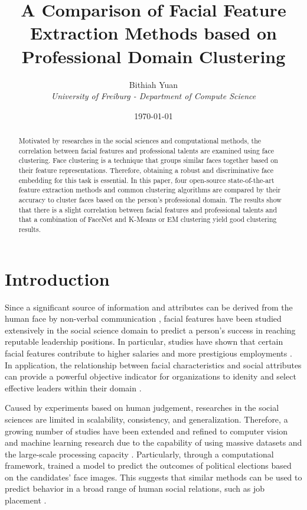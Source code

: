 \documentclass[12pt,english]{article}
\title{A Comparison of Facial Feature Extraction Methods based on Professional Domain Clustering}
\author{Bithiah Yuan \\ \textit{University of Freiburg - Department of Compute Science}}
\date{\normalsize \today}
\begin{document}
\maketitle

\begin{abstract}

Motivated by researches in the social sciences and computational methods, the correlation between facial features and professional talents are examined using  face clustering. Face clustering is a technique that groups similar faces together based on their feature representations. Therefore, obtaining a robust and discriminative face embedding for this task is essential. In this paper, four open-source state-of-the-art feature extraction methods and common clustering algorithms are compared by their accuracy to cluster faces based on the person's professional domain. The results show that there is a slight correlation between facial features and professional talents and that a combination of FaceNet and K-Means or EM clustering yield good clustering results.
\end{abstract}

\section{Introduction}
\label{sec:introduction}

\quad 
Since a significant source of information and attributes can be derived from the human face by non-verbal communication \cite{joo}, facial features have been studied extensively in the social science domain to predict a person's success in reaching reputable leadership positions. In particular, studies have shown that certain facial features contribute to higher salaries and more prestigious employments \cite{olivola}. In application, the relationship between facial characteristics and social attributes can provide a powerful objective indicator for organizations to idenity and select effective leaders within their domain \cite{olivola}. %

Caused by experiments based on human judgement, researches in the social sciences are limited in scalability, consistency, and generalization. Therefore, a growing number of studies have been extended and refined to computer vision and machine learning research due to the capability of using massive datasets and the large-scale processing capacity \cite{joo}. Particularly, through a computational framework, \cite{joo} trained a model to predict the outcomes of political elections based on the candidates' face images. This suggests that similar methods can be used to predict behavior in a broad range of human social relations, such as job placement \cite{joo}.
\end{document}
